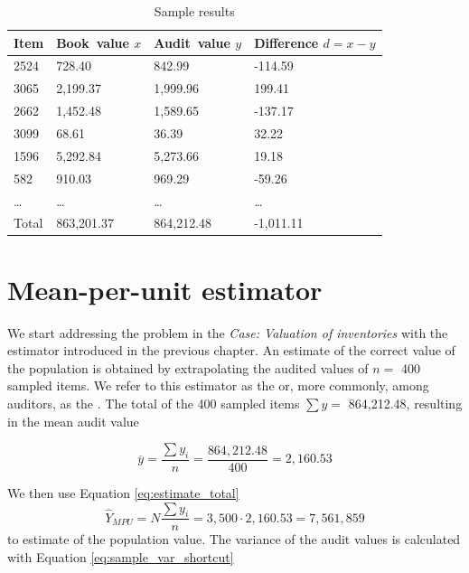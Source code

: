 \begin{table}[htbp]
\begin{tabularx}{\textwidth}{X Y Y Y}
\toprule
\parbox[t]{1.1 cm}{Item} &
Book~value $x$ &
Audit~value $y$ &
Difference $d = x - y$ \\

\midrule

2524 &   728.40 &   842.99 & -114.59 \\
3065 & 2,199.37 & 1,999.96 &  199.41 \\
2662 & 1,452.48 & 1,589.65 & -137.17 \\
3099 &    68.61 &    36.39 &   32.22 \\
1596 & 5,292.84 & 5,273.66 &   19.18 \\
 582 &   910.03 &   969.29 &  -59.26 \\
\ldots & \ldots & \ldots   &  \ldots \\
\midrule
Total & 863,201.37 & 864,212.48 & -1,011.11 \\
\bottomrule
\end{tabularx}

\caption{Sample results}
\label{tab:sample_results}
\end{table}

\section{Mean-per-unit estimator} %
\label{sec:mpu_estimator}

We start addressing the problem in the \emph{Case: Valuation of inventories} with the estimator introduced in the previous chapter. An estimate of the correct value of the population is obtained by extrapolating the audited values of $n = $ 400 sampled items. We refer to this estimator as the  or, more commonly, among auditors, as the . The total  of the 400 sampled items $\sum y =$ 864,212.48, resulting in the mean audit value

\begin{equation*}
\overline{y} = \frac{\sum{y_i}}{n} = \frac{864,212.48}{400} = 2,160.53
\end{equation*}

We then use Equation \ref{eq:estimate_total} 
\begin{equation*}
  \hat{Y}_{MPU} = N\frac{\sum y_i}{n} = 3,500 \cdot 2,160.53 = 7,561,859
\end{equation*}
to estimate of the population value. 
The variance of the audit values is calculated with Equation \ref{eq:sample_var_shortcut}

